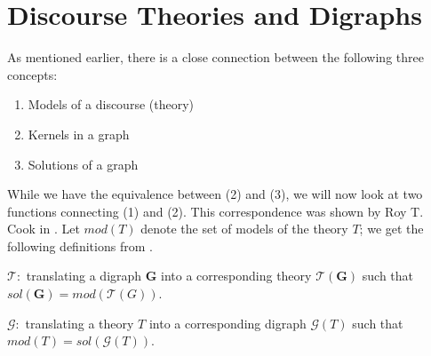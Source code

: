 \section{Discourse Theories and Digraphs}
\label{sec:Discourse Theories and Digraphs}
As mentioned earlier, there is a close connection between the following three concepts:
\begin{enumerate}
  \item Models of a discourse (theory)
  \item Kernels in a graph
  \item Solutions of a graph
\end{enumerate}
While we have the equivalence between (2) and (3), we will now look at two functions connecting (1) and (2).
This correspondence was shown by Roy T. Cook in \cite{cook}.
Let $mod(T)$ denote the set of models of the theory $T$;
we get the following definitions from \cite{apal-digraph}.

$\mathcal{T}:$ translating a digraph \textbf{G} into a corresponding theory $\mathcal{T}(\mathbf{G})$ such that $sol(\mathbf{G}) = mod(\mathcal{T}(G))$.

$\mathcal{G}:$ translating a theory $T$ into a corresponding digraph $\mathcal{G}(T)$ such that $mod(T) = sol(\mathcal{G}(T))$.

